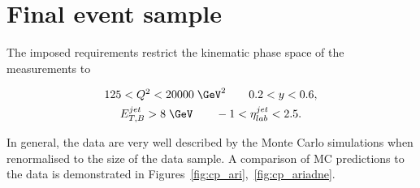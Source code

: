 \section{Final event sample}
\label{sec:eventsampletab}
The imposed requirements restrict the kinematic phase space of the measurements to

\begin{gather}
125 < \qsq < 20000\;\GeV^2 \qquad 0.2 < y < 0.6, \\
\etjetb > 8\;\GeV \qquad -1 < \etajetlab < 2.5.
\end{gather}

In general, the data are very well described by the Monte Carlo simulations when renormalised to the size of the data sample. A comparison of MC predictions to the data is demonstrated in Figures~\ref{fig:cp_ari},~\ref{fig:cp_ariadne}. 


